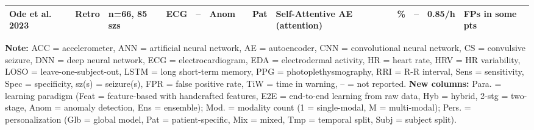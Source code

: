 \begin{landscape}
\begin{table}[htbp]
\begin{tabularx}{\linewidth}{@{} l l l l >{\centering}p{0.7cm} >{\centering}p{0.6cm} >{\centering}p{0.7cm} X >{\centering}p{1.2cm} >{\centering}p{0.8cm} >{\centering}p{1.2cm} X X @{}}
\textbf{Ode et al. 2023} & Retro & n=66, 85 szs & ECG & -- & Anom & 1 & Pat & Self-Attentive AE (attention) & 74\% & -- & 0.85/h & FPs in some pts \\
\bottomrule
\end{tabularx}
\par\medskip
\footnotesize
\textbf{Note:} ACC = accelerometer, ANN = artificial neural network, AE = autoencoder, CNN = convolutional neural network, CS = convulsive seizure, DNN = deep neural network, ECG = electrocardiogram, EDA = electrodermal activity, HR = heart rate, HRV = HR variability, LOSO = leave-one-subject-out, LSTM = long short-term memory, PPG = photoplethysmography, RRI = R-R interval, Sens = sensitivity, Spec = specificity, sz(s) = seizure(s), FPR = false positive rate, TiW = time in warning, -- = not reported. \textbf{New columns:} Para. = learning paradigm (Feat = feature-based with handcrafted features, E2E = end-to-end learning from raw data, Hyb = hybrid, 2-stg = two-stage, Anom = anomaly detection, Ens = ensemble); Mod. = modality count (1 = single-modal, M = multi-modal); Pers. = personalization (Glb = global model, Pat = patient-specific, Mix = mixed, Tmp = temporal split, Subj = subject split).
\end{table}
\end{landscape}
